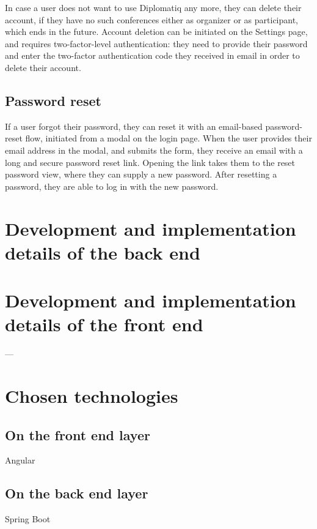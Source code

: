 In case a user does not want to use Diplomatiq any more, they can delete their account, if they have no such conferences either as organizer or as participant, which ends in the future. Account deletion can be initiated on the Settings page, and requires two-factor-level authentication: they need to provide their password and enter the two-factor authentication code they received in email in order to delete their account.

\subsection{Password reset}

If a user forgot their password, they can reset it with an email-based password-reset flow, initiated from a modal on the login page. When the user provides their email address in the modal, and submits the form, they receive an email with a long and secure password reset link. Opening the link takes them to the reset password view, where they can supply a new password. After resetting a password, they are able to log in with the new password.

\section{Development and implementation details of the back end}

\section{Development and implementation details of the front end}















---

\section{Chosen technologies}
\subsection{On the front end layer}
Angular

\subsection{On the back end layer}
Spring Boot

